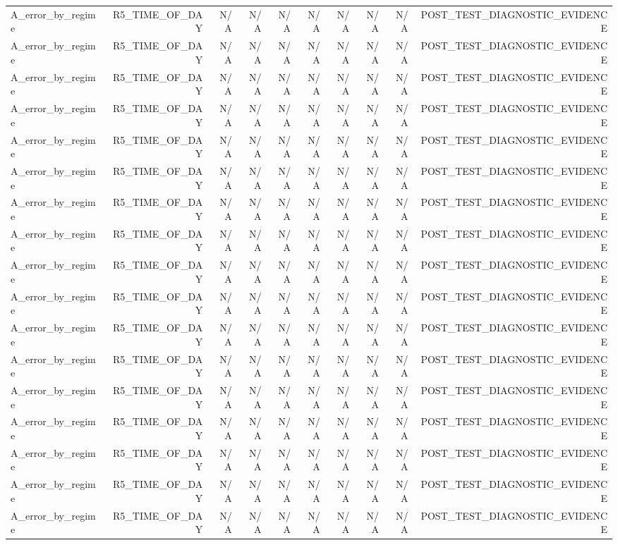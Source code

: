 \begin{table}[h!]
\begin{tabular}{lrrrrrrrrr}
A\_error\_by\_regime & R5\_TIME\_OF\_DAY & N/A & N/A & N/A & N/A & N/A & N/A & N/A & POST\_TEST\_DIAGNOSTIC\_EVIDENCE \\
A\_error\_by\_regime & R5\_TIME\_OF\_DAY & N/A & N/A & N/A & N/A & N/A & N/A & N/A & POST\_TEST\_DIAGNOSTIC\_EVIDENCE \\
A\_error\_by\_regime & R5\_TIME\_OF\_DAY & N/A & N/A & N/A & N/A & N/A & N/A & N/A & POST\_TEST\_DIAGNOSTIC\_EVIDENCE \\
A\_error\_by\_regime & R5\_TIME\_OF\_DAY & N/A & N/A & N/A & N/A & N/A & N/A & N/A & POST\_TEST\_DIAGNOSTIC\_EVIDENCE \\
A\_error\_by\_regime & R5\_TIME\_OF\_DAY & N/A & N/A & N/A & N/A & N/A & N/A & N/A & POST\_TEST\_DIAGNOSTIC\_EVIDENCE \\
A\_error\_by\_regime & R5\_TIME\_OF\_DAY & N/A & N/A & N/A & N/A & N/A & N/A & N/A & POST\_TEST\_DIAGNOSTIC\_EVIDENCE \\
A\_error\_by\_regime & R5\_TIME\_OF\_DAY & N/A & N/A & N/A & N/A & N/A & N/A & N/A & POST\_TEST\_DIAGNOSTIC\_EVIDENCE \\
A\_error\_by\_regime & R5\_TIME\_OF\_DAY & N/A & N/A & N/A & N/A & N/A & N/A & N/A & POST\_TEST\_DIAGNOSTIC\_EVIDENCE \\
A\_error\_by\_regime & R5\_TIME\_OF\_DAY & N/A & N/A & N/A & N/A & N/A & N/A & N/A & POST\_TEST\_DIAGNOSTIC\_EVIDENCE \\
A\_error\_by\_regime & R5\_TIME\_OF\_DAY & N/A & N/A & N/A & N/A & N/A & N/A & N/A & POST\_TEST\_DIAGNOSTIC\_EVIDENCE \\
A\_error\_by\_regime & R5\_TIME\_OF\_DAY & N/A & N/A & N/A & N/A & N/A & N/A & N/A & POST\_TEST\_DIAGNOSTIC\_EVIDENCE \\
A\_error\_by\_regime & R5\_TIME\_OF\_DAY & N/A & N/A & N/A & N/A & N/A & N/A & N/A & POST\_TEST\_DIAGNOSTIC\_EVIDENCE \\
A\_error\_by\_regime & R5\_TIME\_OF\_DAY & N/A & N/A & N/A & N/A & N/A & N/A & N/A & POST\_TEST\_DIAGNOSTIC\_EVIDENCE \\
A\_error\_by\_regime & R5\_TIME\_OF\_DAY & N/A & N/A & N/A & N/A & N/A & N/A & N/A & POST\_TEST\_DIAGNOSTIC\_EVIDENCE \\
A\_error\_by\_regime & R5\_TIME\_OF\_DAY & N/A & N/A & N/A & N/A & N/A & N/A & N/A & POST\_TEST\_DIAGNOSTIC\_EVIDENCE \\
A\_error\_by\_regime & R5\_TIME\_OF\_DAY & N/A & N/A & N/A & N/A & N/A & N/A & N/A & POST\_TEST\_DIAGNOSTIC\_EVIDENCE \\
A\_error\_by\_regime & R5\_TIME\_OF\_DAY & N/A & N/A & N/A & N/A & N/A & N/A & N/A & POST\_TEST\_DIAGNOSTIC\_EVIDENCE \\

\end{tabular}
\end{table}
